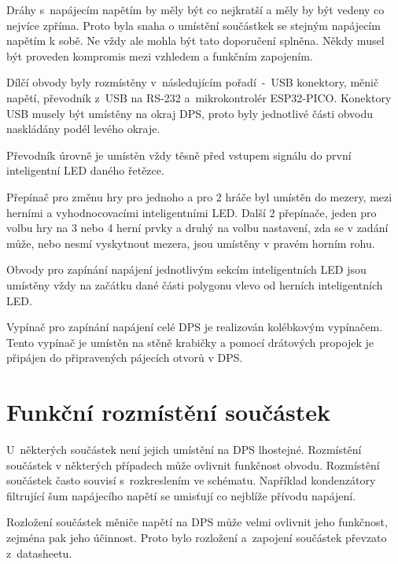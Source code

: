   Dráhy s~napájecím napětím by měly být co nejkratší a měly by být vedeny co nejvíce zpříma. Proto byla snaha o umístění součástkek
  se stejným napájecím napětím k sobě. Ne vždy ale mohla být tato doporučení splněna. Někdy musel být proveden kompromis mezi vzhledem a funkčním 
  zapojením. 

  Dílčí obvody byly rozmístěny v~následujícím pořadí~-~USB konektory, měnič napětí, převodník z~USB 
  na RS-232 a~mikrokontrolér ESP32-PICO. Konektory USB musely být umístěny na okraj DPS, proto byly jednotlivé části obvodu naskládány podél levého okraje.

  Převodník úrovně je umístěn vždy těsně před vstupem signálu do první inteligentní LED daného řetězce.

  Přepínač pro změnu hry pro jednoho a pro 2 hráče byl umístěn do mezery, mezi herními a vyhodnocovacími inteligentními LED. Další 2 přepínače, jeden 
  pro volbu hry na 3 nebo 4 herní prvky a druhý na volbu nastavení, zda se v zadání může, nebo nesmí vyskytnout mezera, jsou umístěny v pravém 
  horním rohu. 

  Obvody pro zapínání napájení jednotlivým sekcím inteligentních LED jsou umístěny vždy na začátku dané části polygonu vlevo od herních inteligentních
  LED.

  Vypínač pro zapínání napájení celé DPS je realizován kolébkovým vypínačem. Tento vypínač je umístěn na stěně krabičky a pomocí drátových propojek 
  je připájen do připravených pájecích otvorů v DPS.

  \section{Funkční rozmístění součástek}
  U~některých součástek není jejich umístění na DPS lhostejné. Rozmístění součástek v některých případech může ovlivnit funkčnost obvodu. 
  Rozmístění součástek často souvisí s~rozkreslením ve schématu. Například kondenzátory filtrující šum napájecího napětí se umisťují co nejblíže přívodu 
  napájení.

  Rozložení součástek měniče napětí na DPS může velmi ovlivnit jeho funkčnost, zejména pak jeho účinnost. Proto bylo rozložení a~zapojení součástek 
  převzato z~datasheetu.

